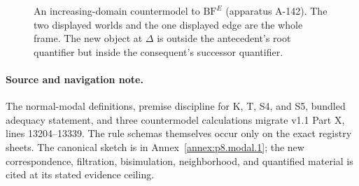 \begin{figure}[!htbp]
\centering
{}
\caption{An increasing-domain countermodel to \(\mathrm{BF}^{E}\) (apparatus A-142).  The two
displayed worlds and the one displayed edge are the whole frame.  The new
object at \(\Delta\) is outside the antecedent's root quantifier but inside the
consequent's successor quantifier.}
\label{fig:p08-barcan-countermodel}
\end{figure}

\paragraph{Source and navigation note.}
The normal-modal definitions, premise discipline for K, T, S4, and S5, bundled adequacy
statement, and three countermodel calculations migrate v1.1 Part X,
lines 13204--13339.  The rule schemas themselves occur only on the exact
registry sheets.  The canonical sketch is in Annex~\ref{annex:p8.modal.1}; the
new correspondence, filtration, bisimulation, neighborhood, and quantified
material is cited at its stated evidence ceiling.
